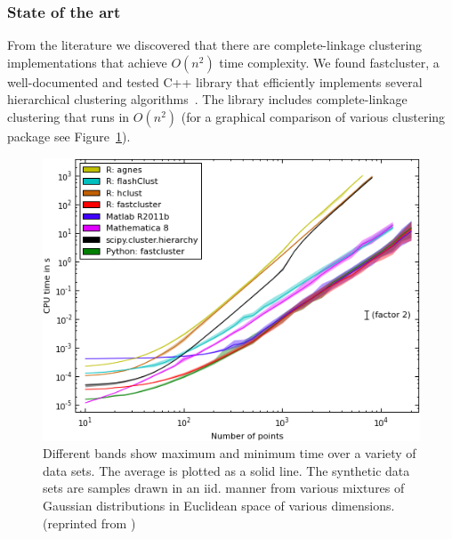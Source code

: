 \subsubsection*{State of the art}
From the literature we discovered that there are complete-linkage clustering implementations that achieve $O(n^2)$ time complexity.
We found fastcluster, a well-documented and tested C++ library that efficiently implements several hierarchical clustering algorithms~\cite{mullner2011modern, FastClust}.
The library includes complete-linkage clustering that runs in $O(n^2)$ (for a graphical comparison of various clustering package see Figure~\ref{fig:FastClustComparison}).

\begin{figure}[h!]
\centering
\includegraphics[scale=0.75]{images/FastComplete-CH3}
\caption[Complete linkage clustering speed comparison between popular implementations.]{Different bands show maximum and minimum time over a variety of data sets. The average is plotted as a solid line. The synthetic data sets are samples drawn in an iid. manner from various mixtures of Gaussian distributions in Euclidean space of various dimensions.
(reprinted from \protect\cite{FastClust})}
\label{fig:FastClustComparison}
\end{figure}

